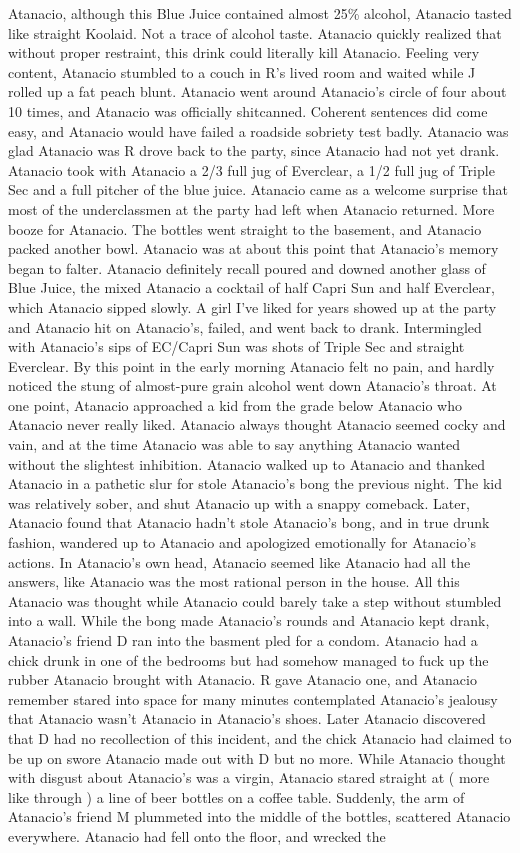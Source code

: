 \documentclass[12pt]{book}
\begin{document}
Atanacio, although this Blue Juice contained almost 25\% alcohol, Atanacio tasted like straight Koolaid. Not a trace of alcohol taste. Atanacio quickly realized that without proper restraint, this drink could literally kill Atanacio. Feeling very content, Atanacio stumbled to a couch in R's lived room and waited while J rolled up a fat peach blunt. Atanacio went around Atanacio's circle of four about 10 times, and Atanacio was officially shitcanned. Coherent sentences did come easy, and Atanacio would have failed a roadside sobriety test badly. Atanacio was glad Atanacio was R drove back to the party, since Atanacio had not yet drank. Atanacio took with Atanacio a 2/3 full jug of Everclear, a 1/2 full jug of Triple Sec and a full pitcher of the blue juice. Atanacio came as a welcome surprise that most of the underclassmen at the party had left when Atanacio returned. More booze for Atanacio. The bottles went straight to the basement, and Atanacio packed another bowl. Atanacio was at about this point that Atanacio's memory began to falter. Atanacio definitely recall poured and downed another glass of Blue Juice, the mixed Atanacio a cocktail of half Capri Sun and half Everclear, which Atanacio sipped slowly. A girl I've liked for years showed up at the party and Atanacio hit on Atanacio's, failed, and went back to drank. Intermingled with Atanacio's sips of EC/Capri Sun was shots of Triple Sec and straight Everclear. By this point in the early morning Atanacio felt no pain, and hardly noticed the stung of almost-pure grain alcohol went down Atanacio's throat. At one point, Atanacio approached a kid from the grade below Atanacio who Atanacio never really liked. Atanacio always thought Atanacio seemed cocky and vain, and at the time Atanacio was able to say anything Atanacio wanted without the slightest inhibition. Atanacio walked up to Atanacio and thanked Atanacio in a pathetic slur for stole Atanacio's bong the previous night. The kid was relatively sober, and shut Atanacio up with a snappy comeback. Later, Atanacio found that Atanacio hadn't stole Atanacio's bong, and in true drunk fashion, wandered up to Atanacio and apologized emotionally for Atanacio's actions. In Atanacio's own head, Atanacio seemed like Atanacio had all the answers, like Atanacio was the most rational person in the house. All this Atanacio was thought while Atanacio could barely take a step without stumbled into a wall. While the bong made Atanacio's rounds and Atanacio kept drank, Atanacio's friend D ran into the basment pled for a condom. Atanacio had a chick drunk in one of the bedrooms but had somehow managed to fuck up the rubber Atanacio brought with Atanacio. R gave Atanacio one, and Atanacio remember stared into space for many minutes contemplated Atanacio's jealousy that Atanacio wasn't Atanacio in Atanacio's shoes. Later Atanacio discovered that D had no recollection of this incident, and the chick Atanacio had claimed to be up on swore Atanacio made out with D but no more. While Atanacio thought with disgust about Atanacio's was a virgin, Atanacio stared straight at ( more like through ) a line of beer bottles on a coffee table. Suddenly, the arm of Atanacio's friend M plummeted into the middle of the bottles, scattered Atanacio everywhere. Atanacio had fell onto the floor, and wrecked the 
\end{document}
